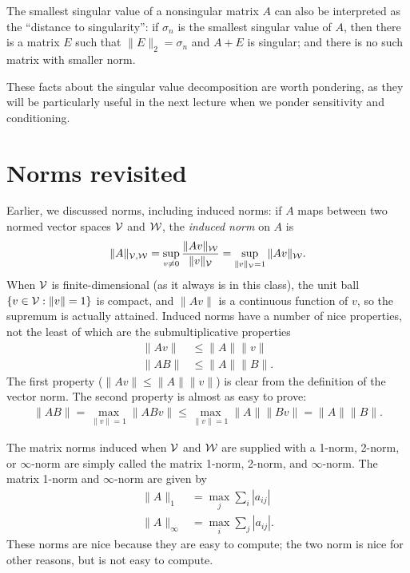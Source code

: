 \documentclass[12pt, leqno]{article}
\begin{document}
The smallest singular value of a nonsingular matrix $A$ can also be
interpreted as the ``distance to singularity'': if $\sigma_n$ is the
smallest singular value of $A$, then there is a matrix $E$ such that
$\|E\|_2 = \sigma_n$ and $A+E$ is singular; and there is no such
matrix with smaller norm.

These facts about the singular value decomposition are worth
pondering, as they will be particularly useful in the next lecture
when we ponder sensitivity and conditioning.

\section{Norms revisited}

Earlier, we discussed norms, including induced norms:
if $A$ maps between two normed vector spaces $\mathcal{V}$ and $\mathcal{W}$,
the {\em induced norm} on $A$ is
\[
  \|A\|_{\mathcal{V},\mathcal{W}}
  = \sup_{v \neq 0} \frac{ \|Av\|_{\mathcal{W}} }{ \|v\|_{\mathcal{V}} }
  = \sup_{\|v\|_{\mathcal{V}} = 1} \|Av\|_{\mathcal{W}}.
\]
When $\mathcal{V}$ is finite-dimensional (as it always is in this class),
the unit ball $\{v \in \mathcal{V} : \|v\| = 1\}$ is compact, and $\|Av\|$
is a continuous function of $v$, so the supremum is actually attained.
Induced norms have a number of nice properties, not the least of
which are the submultiplicative properties
\begin{align*}
  \|Av\| & \leq \|A\| \|v\| \\
  \|AB\| & \leq \|A\| \|B\|.
\end{align*}
The first property ($\|Av\| \leq \|A\| \|v\|$) is clear from the
definition of the vector norm.  The second property is almost as easy
to prove:
\begin{align*}
  \|AB\| =    \max_{\|v\| = 1} \|ABv\|
         \leq \max_{\|v\| = 1} \|A\| \|Bv\|
         = \|A\| \|B\|.
\end{align*}

The matrix norms induced when $\mathcal{V}$ and $\mathcal{W}$ are supplied with a 1-norm,
2-norm, or $\infty$-norm are simply called the matrix 1-norm, 2-norm,
and $\infty$-norm.  The matrix 1-norm and $\infty$-norm are given by
\begin{align*}
  \|A\|_1       &= \max_{j} \sum_{i} |a_{ij}| \\
  \|A\|_{\infty} &= \max_{i} \sum_{j} |a_{ij}|.
\end{align*}
These norms are nice because they are easy to compute; the two norm
is nice for other reasons, but is not easy to compute.
\end{document}
